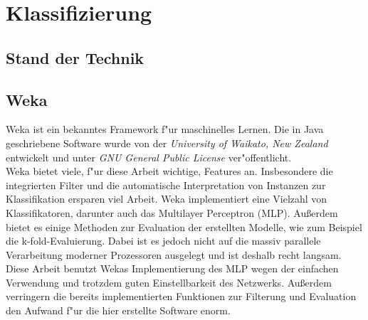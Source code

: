 \section{Klassifizierung}
\label{Klassifizierung}

\subsection{Stand der Technik}
\label{Stand der Technik}

\subsection{Weka}
\label{Weka}
Weka ist ein bekanntes Framework f"ur maschinelles Lernen. Die in Java geschriebene Software wurde von der \textit{University of Waikato, New Zealand} entwickelt und unter \textit{GNU General Public License} ver"offentlicht. \\
Weka bietet viele, f"ur diese Arbeit wichtige, Features an. Insbesondere die integrierten Filter und die automatische Interpretation von Instanzen zur Klassifikation ersparen viel Arbeit. Weka implementiert eine Vielzahl von Klassifikatoren, darunter auch das Multilayer Perceptron (MLP).
Au{\ss}erdem bietet es einige Methoden zur Evaluation der erstellten Modelle, wie zum Beispiel die k-fold-Evaluierung. Dabei ist es jedoch nicht auf die massiv parallele Verarbeitung moderner Prozessoren ausgelegt und ist deshalb recht langsam.\\
Diese Arbeit benutzt Wekas Implementierung des MLP wegen der einfachen Verwendung und trotzdem guten Einstellbarkeit des Netzwerks. Au{\ss}erdem verringern die bereits implementierten Funktionen zur Filterung und Evaluation den Aufwand f"ur die hier erstellte Software enorm.

